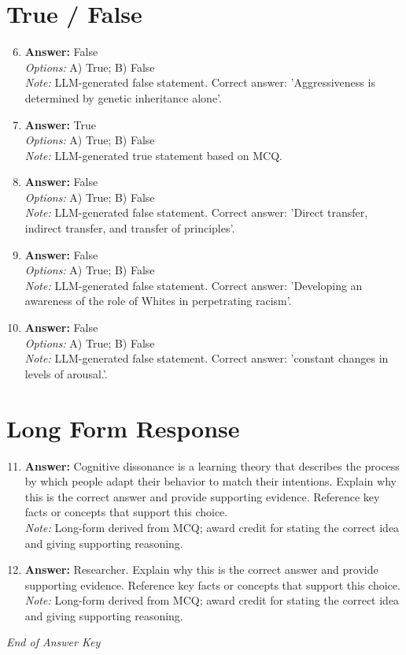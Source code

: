 \documentclass[12pt]{article}
\begin{document}
\section*{True / False}
\begin{enumerate}[label=\arabic*.]
\setcounter{enumi}{5}
\item \textbf{Answer:} False
\\ \textit{Options:} A) True; B) False
\\ \textit{Note:} LLM-generated false statement. Correct answer: 'Aggressiveness is determined by genetic inheritance alone'.
\item \textbf{Answer:} True
\\ \textit{Options:} A) True; B) False
\\ \textit{Note:} LLM-generated true statement based on MCQ.
\item \textbf{Answer:} False
\\ \textit{Options:} A) True; B) False
\\ \textit{Note:} LLM-generated false statement. Correct answer: 'Direct transfer, indirect transfer, and transfer of principles'.
\item \textbf{Answer:} False
\\ \textit{Options:} A) True; B) False
\\ \textit{Note:} LLM-generated false statement. Correct answer: 'Developing an awareness of the role of Whites in perpetrating racism'.
\item \textbf{Answer:} False
\\ \textit{Options:} A) True; B) False
\\ \textit{Note:} LLM-generated false statement. Correct answer: 'constant changes in levels of arousal.'.
\end{enumerate}

\section*{Long Form Response}
\begin{enumerate}[label=\arabic*.]
\setcounter{enumi}{10}
\item \textbf{Answer:} Cognitive dissonance is a learning theory that describes the process by which people adapt their behavior to match their intentions. Explain why this is the correct answer and provide supporting evidence. Reference key facts or concepts that support this choice.
\\ \textit{Note:} Long-form derived from MCQ; award credit for stating the correct idea and giving supporting reasoning.
\item \textbf{Answer:} Researcher. Explain why this is the correct answer and provide supporting evidence. Reference key facts or concepts that support this choice.
\\ \textit{Note:} Long-form derived from MCQ; award credit for stating the correct idea and giving supporting reasoning.
\end{enumerate}

\vfill
\noindent\textit{End of Answer Key}
\end{document}
